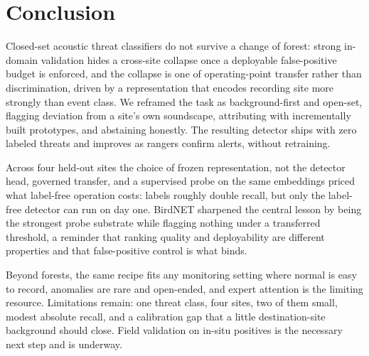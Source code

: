 \section{Conclusion}

Closed-set acoustic threat classifiers do not survive a change of forest: strong
in-domain validation hides a cross-site collapse once a deployable
false-positive budget is enforced, and the collapse is one of operating-point
transfer rather than discrimination, driven by a representation that encodes
recording site more strongly than event class. We reframed the task as
background-first and open-set, flagging deviation from a site's own soundscape,
attributing with incrementally built prototypes, and abstaining honestly. The
resulting detector ships with zero labeled threats and improves as rangers
confirm alerts, without retraining.

Across four held-out sites the choice of frozen representation, not the detector
head, governed transfer, and a supervised probe on the same embeddings priced
what label-free operation costs: labels roughly double recall, but only the
label-free detector can run on day one. BirdNET sharpened the central lesson by
being the strongest probe substrate while flagging nothing under a transferred
threshold, a reminder that ranking quality and deployability are different
properties and that false-positive control is what binds.

Beyond forests, the same recipe fits any monitoring setting where normal is easy
to record, anomalies are rare and open-ended, and expert attention is the
limiting resource. Limitations remain: one threat class, four sites, two of them
small, modest absolute recall, and a calibration gap that a little
destination-site background should close. Field validation on in-situ positives
is the necessary next step and is underway.
